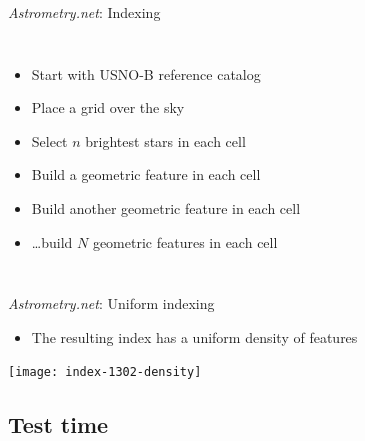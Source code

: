 \documentclass[compress]{beamer}
\newcommand{\an}{\emph{Astrometry.net}\xspace}
\begin{document}
\begin{frame}[plain]{\an: Indexing}
\begin{columns}[onlytextwidth]
	\column{\cwtwo}
    \begin{minipage}[c]{1.25\textwidth}
	  \begin{itemize}
      \setlength{\itemindent}{-10pt}
	  \small
	  \item<1-> Start with USNO-B reference catalog
	  \item<2-> Place a grid over the sky
	  \item<3-> Select $n$ brightest stars in each cell
	  \item<4-> Build a geometric feature in each cell
	  \item<5-> Build \alert{another} geometric feature in each cell
	  \item<6> \ldots build $N$ geometric features in each cell
	\end{itemize}
    \end{minipage}
  \end{columns}
\end{frame}


\begin{frame}{\an: Uniform indexing}
  \begin{itemize}
  \item The resulting index has a uniform density of features
  \end{itemize}

  \begin{center}
	\texttt{[image: index-1302-density]}
  \end{center}
\end{frame}


\subsection{Test time}

\newcommand{\mystrut}{\rule[-1pt]{0pt}{12pt}}
\end{document}
